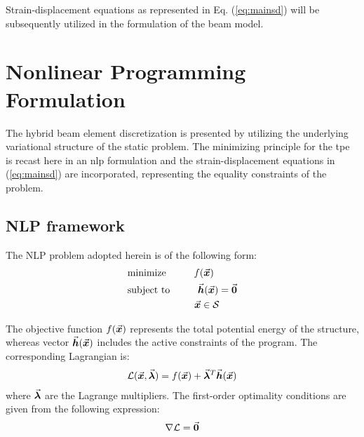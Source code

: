 \noindent Strain-displacement equations as represented in Eq. (\ref{eq:mainsd})
will be subsequently utilized in the formulation of the beam model.

\section{Nonlinear Programming Formulation}\label{section:CH2-S3}

The hybrid beam element discretization is presented by utilizing the underlying
variational structure of the static problem. The minimizing principle for the
\acrshort{tpe} is recast here in an \acrshort{nlp}
formulation and the strain-displacement equations in (\ref{eq:mainsd}) are
incorporated, representing the equality constraints of the problem.

\subsection{NLP framework}\label{subsection:CH2-S3SS1}

The NLP problem adopted herein is of the following form:
\begin{align}
	&\text{minimize} \hspace{1cm}f(\bvec{x})\nonumber\\
	&\text{subject to}\hspace{1.cm}  \bvec{h}(\bvec{x})=\bvec{0}\label{eq:nlp}\\
	&\hspace{2.4cm} \bvec{x}\in\mathcal{S}\nonumber
\end{align}

\noindent The objective function $f(\vec{\boldsymbol{x}})$ represents the total potential
energy of the structure, whereas vector $\vec{\boldsymbol{h}}(\vec{\boldsymbol{x}})$ includes the active
constraints of the program. The corresponding Lagrangian is:
\begin{gather}
	\mathcal{L}(\vec{\boldsymbol{x}},\vec{\boldsymbol{\lambda}}) = f(\vec{\boldsymbol{x}}) + 
	\vec{\boldsymbol{\lambda}}^T\vec{\boldsymbol{h}}(\vec{\boldsymbol{x}})
	\label{eq:lagr}
\end{gather}
\noindent where $\vec{\boldsymbol{\lambda}}$ are the Lagrange multipliers. The first-order
optimality conditions are given from the following expression:
\begin{gather}
	\nabla\mathcal{L}=\vec{\boldsymbol{0}}
	\label{eq:gradz}
\end{gather}

